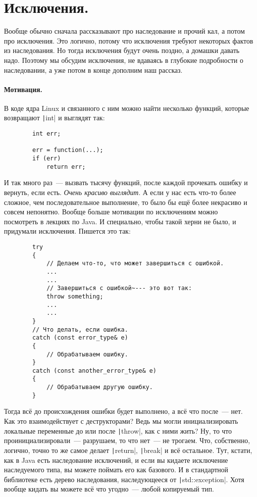 \documentclass{article}
\begin{document}
    \section{Исключения.}
    Вообще обычно сначала рассказывают про наследование и прочий кал, а потом про исключения. Это логично, потому что исключения требуют некоторых фактов из наследования. Но тогда исключения будут очень поздно, а домашки давать надо. Поэтому мы обсудим исключения, не вдаваясь в глубокие подробности о наследовании, а уже потом в конце дополним наш рассказ.
    \paragraph{Мотивация.}
    В коде ядра Linux и связанного с ним можно найти несколько функций, которые возвращают \texttt|int| и выглядят так:
    \begin{verbatim}
        int err;
        
        err = function(...);
        if (err)
            return err;
    \end{verbatim}
    И так много раз~--- вызвать тысячу функций, после каждой прочекать ошибку и вернуть, если есть. \textit{Очень красиво выглядит}. А если у нас есть что-то более сложное, чем последовательное выполнение, то было бы ещё более некрасиво и совсем непонятно. Вообще больше мотивации по исключениям можно посмотреть в лекциях по Java. И специально, чтобы такой херни не было, и придумали исключения. Пишется это так:
    \begin{verbatim}
        try
        {
            // Делаем что-то, что может завершиться с ошибкой.
            ...
            ...
            // Завершиться с ошибкой~--- это вот так:
            throw something;
            ...
            ...
        }
        // Что делать, если ошибка.
        catch (const error_type& e)
        {
            // Обрабатываем ошибку.
        }
        catch (const another_error_type& e)
        {
            // Обрабатываем другую ошибку.
        }
    \end{verbatim}
    Тогда всё до происхождения ошибки будет выполнено, а всё что после~--- нет. Как это взаимодействует с деструкторами? Ведь мы могли инициализировать локальные переменные до или после \texttt|throw|, как с ними жить? Ну, то что проинициализировали~--- разрушаем, то что нет~--- не трогаем. Что, собственно, логично, точно то же самое делает \texttt|return|, \texttt|break| и всё остальное. Тут, кстати, как в Java есть наследование исключений, и если вы кидаете исключение наследуемого типа, вы можете поймать его как базового. И в стандартной библиотеке есть дерево наследования, наследующееся от \texttt|std::exception|. Хотя вообще кидать вы можете всё что угодно~--- любой копируемый тип.
\end{document}
